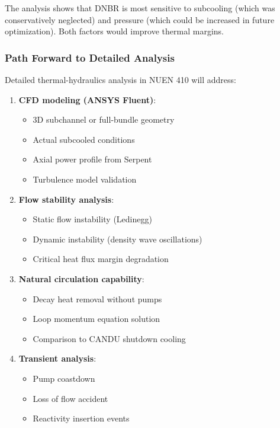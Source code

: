 The analysis shows that DNBR is most sensitive to subcooling (which was conservatively neglected) and pressure (which could be increased in future optimization). Both factors would improve thermal margins.

\subsubsection{Path Forward to Detailed Analysis}

Detailed thermal-hydraulics analysis in NUEN 410 will address:

\begin{enumerate}
    \item \textbf{CFD modeling (ANSYS Fluent)}:
    \begin{itemize}
        \item 3D subchannel or full-bundle geometry
        \item Actual subcooled conditions
        \item Axial power profile from Serpent
        \item Turbulence model validation
    \end{itemize}
    
    \item \textbf{Flow stability analysis}:
    \begin{itemize}
        \item Static flow instability (Ledinegg)
        \item Dynamic instability (density wave oscillations)
        \item Critical heat flux margin degradation
    \end{itemize}
    
    \item \textbf{Natural circulation capability}:
    \begin{itemize}
        \item Decay heat removal without pumps
        \item Loop momentum equation solution
        \item Comparison to CANDU shutdown cooling
    \end{itemize}
    
    \item \textbf{Transient analysis}:
    \begin{itemize}
        \item Pump coastdown
        \item Loss of flow accident
        \item Reactivity insertion events
    \end{itemize}
\end{enumerate}